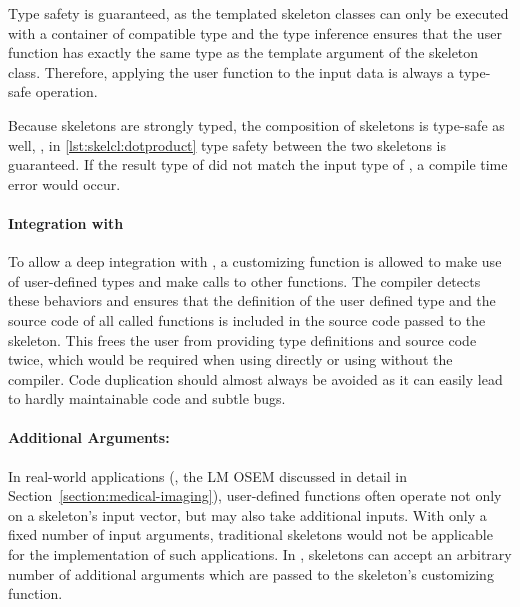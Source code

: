 Type safety is guaranteed, as the templated skeleton classes can only be executed with a container of compatible type and the type inference ensures that the user function has exactly the same type as the template argument of the skeleton class.
Therefore, applying the user function to the input data is always a type-safe operation.

Because skeletons are strongly typed, the composition of skeletons is type-safe as well, \ie, in \autoref{lst:skelcl:dotproduct} type safety between the two skeletons is guaranteed.
If the result type of  did not match the input type of , a compile time error would occur.

\paragraph{Integration with \Cpp}
To allow a deep integration with \Cpp, a customizing function is allowed to make use of user-defined types and make calls to other functions.
The  compiler detects these behaviors and ensures that the definition of the user defined type and the source code of all called functions is included in the source code passed to the skeleton.
This frees the user from providing type definitions and source code twice, which would be required when using \OpenCL directly or using \SkelCL without the  compiler.
Code duplication should almost always be avoided as it can easily lead to hardly maintainable code and subtle bugs.

\paragraph{Additional Arguments:}
In real-world applications (\eg, the LM OSEM discussed in detail in Section~\ref{section:medical-imaging}), user-defined functions often operate not only on a skeleton's input vector, but may also take additional inputs.
With only a fixed number of input arguments, traditional skeletons would not be applicable for the implementation of such applications.
In \SkelCL, skeletons can accept an arbitrary number of additional arguments which are passed to the skeleton's customizing function.

